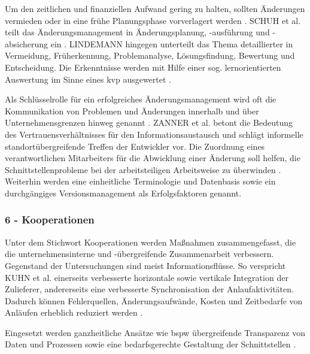 Um den zeitlichen und finanziellen Aufwand gering zu halten, sollten Änderungen vermieden oder in eine frühe Planungsphase vorverlagert werden \autocite{Schuh2008, Jania2004, Ass98}. 
SCHUH et al. teilt das Änderungsmanagement in Änderungsplanung, -ausführung und -ab\-si\-che\-rung ein \autocite[217]{Schuh2008}. 
LINDEMANN hingegen unterteilt das Thema detaillierter in Vermeidung, Früherkennung, Problemanalyse, Lösungsfindung, Bewertung und Entscheidung. Die Erkenntnisse werden mit Hilfe einer sog. lernorientierten Auswertung im Sinne eines \gls{kvp} ausgewertet \autocite{Lindemann1998}. 

Als Schlüsselrolle für ein erfolgreiches Änderungsmanagement wird oft die Kommunikation von Problemen und Änderungen innerhalb und über Unternehmensgrenzen hinweg genannt \autocite{Kuhn2002, Schuh2008}.
ZANNER et al. betont die Bedeutung des Vertrauensverhältnisses für den Informationsaustausch und schlägt informelle standortübergreifende Treffen der Entwickler vor. Die Zuordnung eines verantwortlichen Mitarbeiters für die Abwicklung einer Änderung soll helfen, die Schnittstellenprobleme bei der arbeitsteiligen Arbeitsweise zu überwinden  \autocite[42]{Zanner2002}.
Weiterhin werden eine einheitliche Terminologie \autocite{Zanner2002} und Datenbasis sowie ein durchgängiges Versionsmanagement \autocite{Kuhn2002} als Erfolgsfaktoren genannt. 
\subsubsection*{6 - Kooperationen}
Unter dem Stichwort Kooperationen werden Maßnahmen zusammengefasst, die die unternehmensinterne und -übergreifende Zusammenarbeit verbessern. Gegenstand der Untersuchungen sind meist Informationsflüsse. 
So verspricht KUHN et al. einerseits verbesserte horizontale sowie vertikale Integration der Zulieferer, andererseits eine verbesserte Synchronisation der Anlaufaktivitäten. Dadurch können Fehlerquellen, Änderungsaufwände, Kosten und Zeitbedarfe von Anläufen erheblich reduziert werden \autocite[26]{Kuhn2002}. 

Eingesetzt werden ganzheitliche Ansätze wie \gls{bspw} übergreifende Transparenz von Daten und Prozessen sowie eine bedarfsgerechte Gestaltung der Schnittstellen \autocite{Kuhn2002}. 

